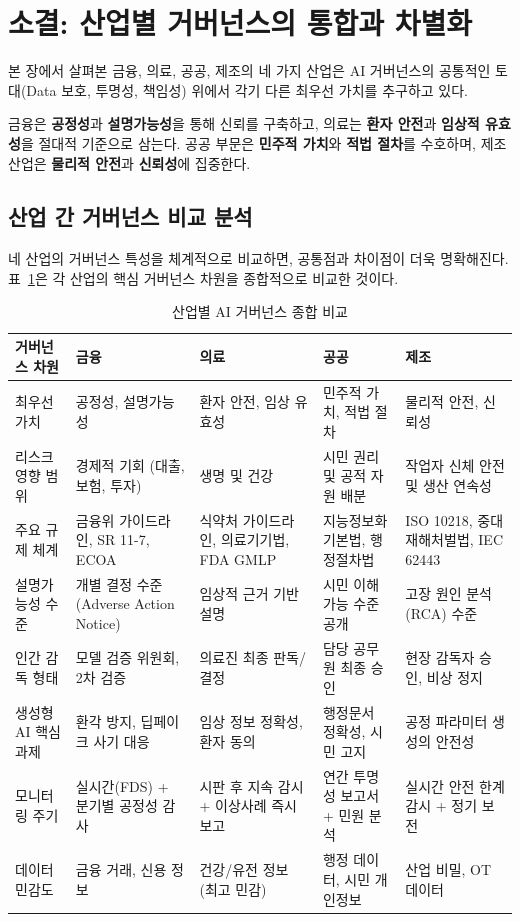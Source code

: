 \section{소결: 산업별 거버넌스의 통합과 차별화}
\label{sec:5.5}

본 장에서 살펴본 금융, 의료, 공공, 제조의 네 가지 산업은 AI 거버넌스의 공통적인 토대(Data 보호, 투명성, 책임성) 위에서 각기 다른 최우선 가치를 추구하고 있다.

금융은 \textbf{공정성}과 \textbf{설명가능성}을 통해 신뢰를 구축하고, 의료는 \textbf{환자 안전}과 \textbf{임상적 유효성}을 절대적 기준으로 삼는다. 공공 부문은 \textbf{민주적 가치}와 \textbf{적법 절차}를 수호하며, 제조 산업은 \textbf{물리적 안전}과 \textbf{신뢰성}에 집중한다.

\subsection{산업 간 거버넌스 비교 분석}
\label{sec:5.5.1}

네 산업의 거버넌스 특성을 체계적으로 비교하면,
공통점과 차이점이 더욱 명확해진다.
표~\ref{tab:cross_industry_comparison}은
각 산업의 핵심 거버넌스 차원을 종합적으로 비교한 것이다.

\begin{table}[htbp]
\centering
\caption{산업별 AI 거버넌스 종합 비교}
\label{tab:cross_industry_comparison}
\begin{tabularx}{\textwidth}{p{2.2cm}p{2.8cm}p{2.8cm}p{2.8cm}p{2.8cm}}
\toprule
\textbf{거버넌스 차원} & \textbf{금융} & \textbf{의료} & \textbf{공공} & \textbf{제조} \\
\midrule
최우선 가치 &
공정성, 설명가능성 &
환자 안전, 임상 유효성 &
민주적 가치, 적법 절차 &
물리적 안전, 신뢰성 \\
\midrule
리스크 영향 범위 &
경제적 기회 (대출, 보험, 투자) &
생명 및 건강 &
시민 권리 및 공적 자원 배분 &
작업자 신체 안전 및 생산 연속성 \\
\midrule
주요 규제 체계 &
금융위 가이드라인, SR 11-7, ECOA &
식약처 가이드라인, 의료기기법, FDA GMLP &
지능정보화 기본법, 행정절차법 &
ISO 10218, 중대재해처벌법, IEC 62443 \\
\midrule
설명가능성 수준 &
개별 결정 수준 (Adverse Action Notice) &
임상적 근거 기반 설명 &
시민 이해 가능 수준 공개 &
고장 원인 분석(RCA) 수준 \\
\midrule
인간 감독 형태 &
모델 검증 위원회, 2차 검증 &
의료진 최종 판독/결정 &
담당 공무원 최종 승인 &
현장 감독자 승인, 비상 정지 \\
\midrule
생성형 AI 핵심 과제 &
환각 방지, 딥페이크 사기 대응 &
임상 정보 정확성, 환자 동의 &
행정문서 정확성, 시민 고지 &
공정 파라미터 생성의 안전성 \\
\midrule
모니터링 주기 &
실시간(FDS) + 분기별 공정성 감사 &
시판 후 지속 감시 + 이상사례 즉시 보고 &
연간 투명성 보고서 + 민원 분석 &
실시간 안전 한계 감시 + 정기 보전 \\
\midrule
데이터 민감도 &
금융 거래, 신용 정보 &
건강/유전 정보 (최고 민감) &
행정 데이터, 시민 개인정보 &
산업 비밀, OT 데이터 \\
\bottomrule
\end{tabularx}
\end{table}


